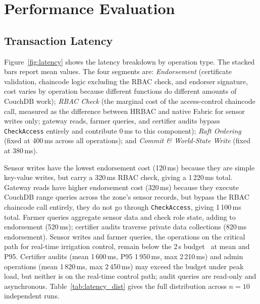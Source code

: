 \documentclass[a4paper,fleqn]{cas-dc}
\begin{document}
\section{Performance Evaluation}
\label{sec:evaluation}

\subsection{Transaction Latency}
\label{subsec:latency}

Figure~\ref{fig:latency} shows the latency breakdown by operation type.
The stacked bars report mean values. The four segments are:
\emph{Endorsement} (certificate validation,
chaincode logic excluding the RBAC check, and endorser signature,
cost varies by operation because different functions do different amounts
of CouchDB work); \emph{RBAC Check} (the marginal cost of the
access-control chaincode call, measured as the difference between HRBAC
and native Fabric for sensor writes only; gateway reads, farmer queries,
and certifier audits bypass \texttt{CheckAccess} entirely and contribute
0\,ms to this component); \emph{Raft Ordering} (fixed at
400\,ms across all operations); and \emph{Commit \& World-State Write}
(fixed at 380\,ms).

Sensor writes have the lowest endorsement cost (120\,ms) because they
are simple key-value writes, but carry a 320\,ms RBAC check, giving a
1\,220\,ms total. Gateway reads have higher endorsement cost (320\,ms)
because they execute CouchDB range queries across the zone's sensor
records, but bypass the RBAC chaincode call entirely, they do not go
through \texttt{CheckAccess}, giving 1\,100\,ms total. Farmer queries
aggregate sensor data and check role state, adding to endorsement (520\,ms);
certifier audits traverse private data collections (820\,ms endorsement).
Sensor writes and farmer queries, the operations on the critical path
for real-time irrigation control, remain below the 2\,s
budget~\cite{leacox2013wireless} at mean and P95. Certifier audits
(mean 1\,600\,ms, P95 1\,950\,ms, max 2\,210\,ms) and admin operations
(mean 1\,820\,ms, max 2\,450\,ms) may exceed the budget under peak load,
but neither is on the real-time control path; audit queries are
read-only and asynchronous.
Table~\ref{tab:latency_dist} gives the full distribution across
$n{=}10$ independent runs.
\end{document}

